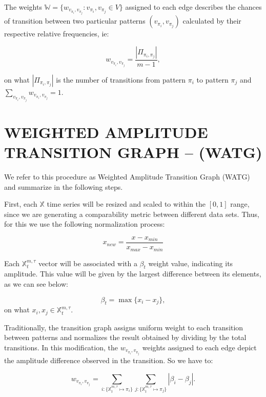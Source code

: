 \documentclass{isprs}
\begin{document}
	The weights $\mathbb{W} = \{w_{v_{\pi_i}, v_{\pi_j}}: v_{\pi_i}, v_{\pi_j} \in V \}$ assigned to each edge describes the chances of transition between two particular patterns $(v_{\pi_i}, v_{\pi_j})$ calculated by their respective relative frequencies, ie:
	
	\begin{equation}
	w_{v_{\pi_i}, v_{\pi_j}} = \frac{|\Pi_{\pi_i,\pi_j}|}{m-1},
	\end{equation}
	
	on what $|\Pi_{\pi_i,\pi_j}|$ is the number of transitions from pattern $\pi_i$ to pattern $\pi_j$ and $\sum_{v_{\pi_i}, v_{\pi_j}}w_{v_{\pi_i}, v_{\pi_j}} = 1$.
	
	\section{WEIGHTED AMPLITUDE TRANSITION GRAPH -- (WATG)}\label{WATG}
	
	We refer to this procedure as Weighted Amplitude Transition Graph (WATG) and summarize in the following steps.
	
	First, each $\mathbb{X}$ time series will be resized and scaled to within the $[0, 1]$ range, since we are generating a comparability metric between different data sets.
	Thus, for this we use the following normalization process:
	
	\begin{equation}
	x_{new} = \frac{x - x_{min}}{x_{max} - x_{min}}
	\end{equation}
	
	
	Each $\mathbb{X}^{m, \tau}_t$ vector will be associated with a $\beta_t$ weight value, indicating its amplitude.
	This value will be given by the largest difference between its elements, as we can see below:
	
	
	\begin{equation}
	\beta_t = \max\{x_i - x_j\},
	\end{equation}
	on what $x_i, x_j \in \mathbb{X}^{m, \tau}_t$.
	
	Traditionally, the transition graph assigns uniform weight to each transition between patterns and normalizes the result obtained by dividing by the total transitions.
	In this modification, the $w_{v_{\pi_i}, v_{\pi_j}}$ weights assigned to each edge depict the amplitude difference observed in the transition.
	So we have to:
	
	\begin{equation}
	w_{v_{\pi_i}, v_{\pi_j}} =  \sum_{i : \{\mathbb{X}^{m,\tau}_t \mapsto \pi_i\}} \sum_{j : \{\mathbb{X}^{m,\tau}_t \mapsto \pi_j\}} |\beta_i - \beta_j| .
	\end{equation}
	
\end{document}
